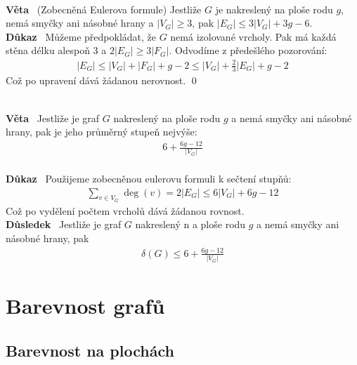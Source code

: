 \documentclass{article}
\renewcommand{\paragraph}[1]{\ \\\smallskip\noindent\textbf{#1}\ }
\begin{document}
\paragraph{Věta} (Zobecněná Eulerova formule)
Jestliže $G$ je nakreslený na ploše rodu $g$, nemá smyčky ani násobné hrany a 
$|V_G| \geq 3$, pak $|E_G| \leq 3|V_G| + 3g - 6$.
\paragraph{Důkaz}
Můžeme předpokládat, že $G$ nemá izolované vrcholy. Pak má každá stěna délku 
alespoň $3$ a $2|E_G| \geq 3|F_G|$. Odvodíme z předešlého pozorování:
\begin{align}
	|E_G| \leq |V_G| + |F_G| + g - 2 \leq |V_G| + \frac{2}{3}|E_G| + g - 2
\end{align}
Což po upravení dává žádanou nerovnost. \qed

\paragraph{Věta} Jestliže je graf $G$ nakreslený na ploše rodu $g$ a nemá smyčky 
ani násobné hrany, pak je jeho průměrný stupeň nejvýše: \begin{align}6 + 
\frac{6g-12}{|V_G|}\end{align}
\paragraph{Důkaz}
Použijeme zobecněnou eulerovu formuli k sečtení stupňů:
\begin{align}
	\sum_{v\in V_G} \deg(v) = 2|E_G| \leq 6|V_G| + 6g - 12
\end{align}
Což po vydělení počtem vrcholů dává žádanou rovnost.
\paragraph{Důsledek}
Jestliže je graf $G$ nakreslený n a ploše rodu $g$ a nemá smyčky ani násobné 
hrany, pak
\begin{align}
	\delta(G) \leq 6 + \frac{6g-12}{|V_G|}
\end{align}

\section{Barevnost grafů}
\subsection{Barevnost na plochách}
\end{document}
